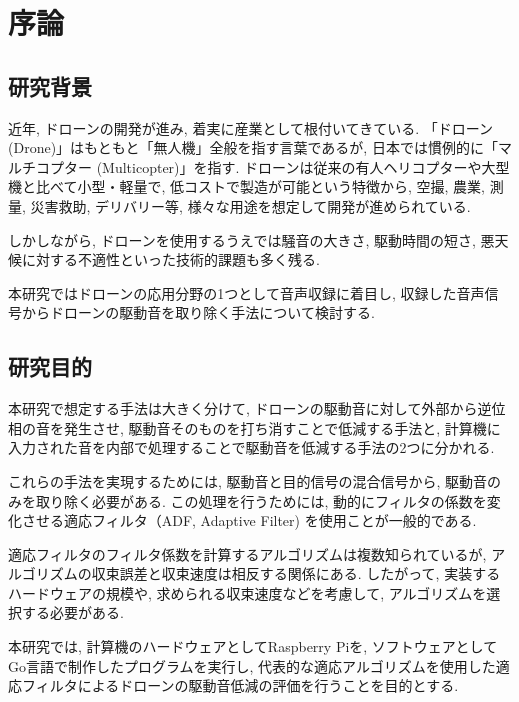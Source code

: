 \chapter{序論}\label{introduction}

\section{研究背景}\label{research-background}

近年, ドローンの開発が進み, 着実に産業として根付いてきている. 
「ドローン (Drone)」はもともと「無人機」全般を指す言葉であるが, 日本では慣例的に「マルチコプター (Multicopter)」を指す. 
ドローンは従来の有人ヘリコプターや大型機と比べて小型・軽量で, 低コストで製造が可能という特徴から, 空撮, 農業, 測量, 災害救助, デリバリー等, 様々な用途を想定して開発が進められている. 

しかしながら, ドローンを使用するうえでは騒音の大きさ, 駆動時間の短さ, 悪天候に対する不適性といった技術的課題も多く残る. 

本研究ではドローンの応用分野の1つとして音声収録に着目し, 収録した音声信号からドローンの駆動音を取り除く手法について検討する. 

\section{研究目的}\label{ux7814ux7a76ux76eeux7684}

本研究で想定する手法は大きく分けて, ドローンの駆動音に対して外部から逆位相の音を発生させ, 駆動音そのものを打ち消すことで低減する手法と, 計算機に入力された音を内部で処理することで駆動音を低減する手法の2つに分かれる. 

これらの手法を実現するためには, 駆動音と目的信号の混合信号から, 駆動音のみを取り除く必要がある. この処理を行うためには, 動的にフィルタの係数を変化させる適応フィルタ（ADF, Adaptive
Filter) を使用ことが一般的である. 

適応フィルタのフィルタ係数を計算するアルゴリズムは複数知られているが, アルゴリズムの収束誤差と収束速度は相反する関係にある. したがって, 実装するハードウェアの規模や, 求められる収束速度などを考慮して, アルゴリズムを選択する必要がある. 

本研究では, 計算機のハードウェアとしてRaspberry Piを, ソフトウェアとしてGo言語で制作したプログラムを実行し, 代表的な適応アルゴリズムを使用した適応フィルタによるドローンの駆動音低減の評価を行うことを目的とする. 
